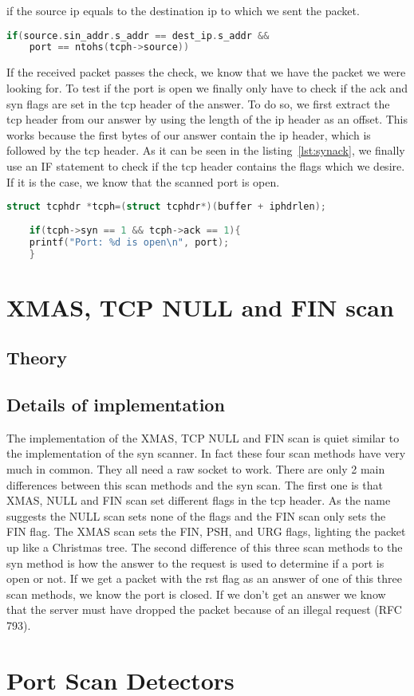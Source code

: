 \documentclass[a4paper]{scrartcl}
\begin{document}
	if the source ip equals to the destination ip to which we sent the packet.
	\begin{lstlisting}[frame= single, language=C, caption= IF statement to check origin of packet, label=lst:checkorigin]
	if(source.sin_addr.s_addr == dest_ip.s_addr &&
	port == ntohs(tcph->source))
	\end{lstlisting}
	If the received packet passes the check, we know that we have the packet we were looking for. To test if the port is open we finally only have to check if the ack and syn flags are set in the tcp header
	of the answer. To do so, we first extract the tcp header from our answer by using the length of the ip header as an offset. This works because the first bytes of our answer contain the ip header, which
	is followed by the tcp header. As it can be seen in the listing~\ref{lst:synack}, we finally use an IF statement to check if the tcp header contains the flags which we desire. If it is the case, we know that the scanned
	port is open.
	\begin{lstlisting}[frame= single, language=C, caption=C code to check if answer contains syn and ack flag, label=lst:synack]
	struct tcphdr *tcph=(struct tcphdr*)(buffer + iphdrlen);
	
	if(tcph->syn == 1 && tcph->ack == 1){
	printf("Port: %d is open\n", port);
	} 
	\end{lstlisting}
	\section{XMAS, TCP NULL and FIN scan}
		\subsection{Theory}
		
		\subsection{Details of implementation}
		The implementation of the XMAS, TCP NULL and FIN scan is quiet similar to the implementation of the syn scanner. In fact these four scan methods have very much in common.
		They all need a raw socket to work. There are only 2 main differences between this scan methods and the syn scan. The first one is that XMAS, NULL and FIN scan set different flags
		in the tcp header. As the name suggests the NULL scan sets none of the flags and the FIN scan only sets the FIN flag. The XMAS scan sets the FIN, PSH, and URG flags, lighting the packet up like a Christmas tree.
		The second difference of this three scan methods to the syn method is how the answer to the request is used to determine if a port is open or not. If we get a packet with the rst flag as an answer of one
		of this three scan methods, we know the port is closed. If we don't get an answer we know that the server must have dropped the packet because of an illegal request (RFC 793).
		
		
		
	\section{Port Scan Detectors}
	
	
	
	
	\newpage
	\printbibliography
\end{document}
